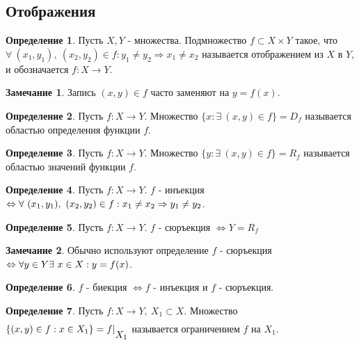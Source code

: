 \documentclass[a4paper, 12pt]{article}
\newcommand{\lra}{\Leftrightarrow}
\theoremstyle{definition}
\newtheorem*{definition}{Определение}
\newtheorem*{comm}{Замечание}
\begin{document}
    \subsection{Отображения}
        \begin{definition}
            Пусть $X, Y$ - множества. Подмножество $f\subset X\times Y$ такое, что $\forall\ (x_1,y_1),\ (x_2, y_2)\in f: y_1\ne y_2 \Rightarrow x_1\ne x_2$ называется отображением из $X$ в $Y$, и обозначается $f: X\to Y$.
        \end{definition}
        \begin{comm}
            Запись $(x,y)\in f$ часто заменяют на $y=f(x)$.
            \end{comm}
        \begin{definition}
            Пусть $f:X\to Y$. Множество $\{x: \exists\ (x,y) \in f\} = D_f$ называется областью определения функции $f$.
        \end{definition}
        \begin{definition}
            Пусть $f:X\to Y$. Множество $\{y: \exists\ (x,y) \in f\} = R_f$ называется областью значений функции $f$.
        \end{definition}
        \begin{definition}
            Пусть $f:X\to Y$. $f$ - инъекция $\lra \forall\ (x_1,y_1),\ (x_2,y_2)\in f: \\ x_1\ne x_2 \Rightarrow y_1\ne y_2$.
        \end{definition}
        \begin{definition}
            Пусть $f:X\to Y$. $f$ - сюръекция $\lra Y=R_f$
        \end{definition}
        \begin{comm}
        Обычно используют определение $f$ - сюръекция $\lra \forall y\in Y \\ \exists\ x\in X: y=f(x)$.
        \end{comm}
        \begin{definition}
            $f$ - биекция $\lra f$ - инъекция и $f$ - сюръекция.
        \end{definition}
        \begin{definition}
            Пусть $f:X\to Y,\ X_1\subset X$. Множество $\{(x,y)\in f: x\in X_1\}=f|\begin{matrix}
                \null \\ X_1
            \end{matrix}$ называется ограничением $f$ на $X_1$.
        \end{definition}
\end{document}
